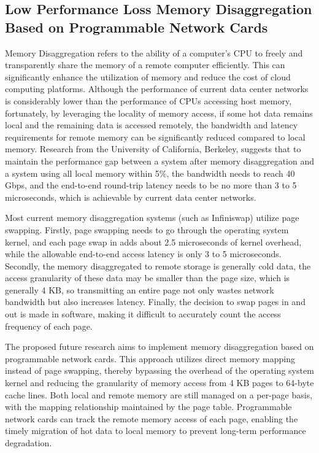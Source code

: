 \subsection{Low Performance Loss Memory Disaggregation Based on Programmable Network Cards}

Memory Disaggregation refers to the ability of a computer's CPU to freely and transparently share the memory of a remote computer efficiently. This can significantly enhance the utilization of memory and reduce the cost of cloud computing platforms.
Although the performance of current data center networks is considerably lower than the performance of CPUs accessing host memory, fortunately, by leveraging the locality of memory access, if some hot data remains local and the remaining data is accessed remotely, the bandwidth and latency requirements for remote memory can be significantly reduced compared to local memory. Research from the University of California, Berkeley, suggests that to maintain the performance gap between a system after memory disaggregation and a system using all local memory within 5\%, the bandwidth needs to reach 40 Gbps, and the end-to-end round-trip latency needs to be no more than 3 to 5 microseconds, which is achievable by current data center networks.

Most current memory disaggregation systems (such as Infiniswap) utilize page swapping. Firstly, page swapping needs to go through the operating system kernel, and each page swap in adds about 2.5 microseconds of kernel overhead, while the allowable end-to-end access latency is only 3 to 5 microseconds. Secondly, the memory disaggregated to remote storage is generally cold data, the access granularity of these data may be smaller than the page size, which is generally 4 KB, so transmitting an entire page not only wastes network bandwidth but also increases latency. Finally, the decision to swap pages in and out is made in software, making it difficult to accurately count the access frequency of each page.

The proposed future research aims to implement memory disaggregation based on programmable network cards. This approach utilizes direct memory mapping instead of page swapping, thereby bypassing the overhead of the operating system kernel and reducing the granularity of memory access from 4 KB pages to 64-byte cache lines. Both local and remote memory are still managed on a per-page basis, with the mapping relationship maintained by the page table. Programmable network cards can track the remote memory access of each page, enabling the timely migration of hot data to local memory to prevent long-term performance degradation.

